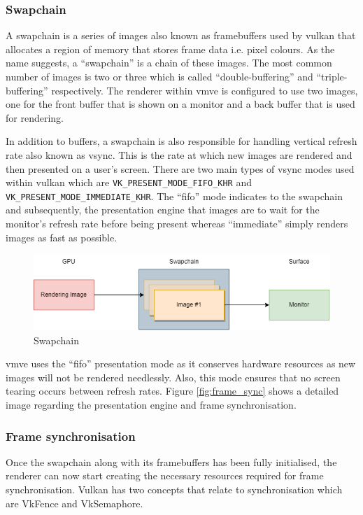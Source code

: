 \documentclass[11pt]{article}
\begin{document}
\subsubsection{Swapchain}
A swapchain is a series of images also known as framebuffers used by
\gls*{vulkan} that allocates a region of memory that stores frame data i.e.
pixel colours. As the name suggests, a ``swapchain'' is a chain of these images.
The most common number of images is two or three which is called
``double-buffering'' and ``triple-buffering'' respectively. The renderer within
\gls*{vmve} is configured to use two images, one for the front buffer that is
shown on a monitor and a back buffer that is used for rendering.

In addition to buffers, a swapchain is also responsible for handling vertical
refresh rate also known as vsync. This is the rate at which new images are
rendered and then presented on a user's screen. There are two main types of
vsync modes used within \gls*{vulkan} which are
\lstinline{VK_PRESENT_MODE_FIFO_KHR} and
\lstinline{VK_PRESENT_MODE_IMMEDIATE_KHR}. The ``fifo'' mode indicates to the
swapchain and subsequently, the presentation engine that images are to wait for
the monitor's refresh rate before being present whereas ``immediate'' simply
renders images as fast as possible.

\begin{figure}[H]
  \centering
  \includegraphics[width=\textwidth]{images/swapchain.png}
  \caption{Swapchain}
  \label{fig:swapchain}
\end{figure}

\gls*{vmve} uses the ``fifo'' presentation mode as it conserves hardware
resources as new images will not be rendered needlessly. Also, this mode ensures
that no screen tearing occurs between refresh rates. Figure \ref{fig:frame_sync}
shows a detailed image regarding the presentation engine and frame
synchronisation.

\subsubsection{Frame synchronisation}
Once the swapchain along with its framebuffers has been fully initialised, the
renderer can now start creating the necessary resources required for frame
synchronisation. Vulkan has two concepts that relate to synchronisation which
are VkFence and VkSemaphore.
\end{document}
